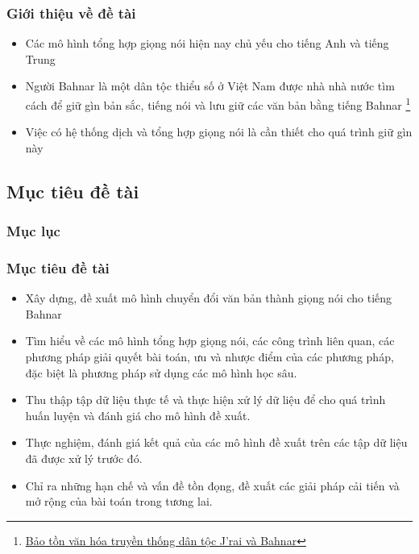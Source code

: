 \documentclass{beamer}
\numberwithin{figure}{section}
\numberwithin{table}{section}
\begin{document}
\begin{frame}
\frametitle{Giới thiệu về đề tài}
\begin{itemize}
    \item [--] Các mô hình tổng hợp giọng nói hiện nay chủ yếu cho tiếng Anh và tiếng Trung \cite{survey}
    \pause
    \item [--] Người Bahnar là một dân tộc thiểu số ở Việt Nam được nhà nhà nước tìm cách để giữ gìn bản sắc, tiếng nói và lưu giữ các văn bản bằng tiếng Bahnar \footnote{\href{https://dangcongsan.vn/tu-tuong-van-hoa/bao-ton-van-hoa-truyen-thong-dan-toc-jrai-va-bahnar-367994.html}{Bảo tồn văn hóa truyền thống dân tộc J’rai và Bahnar}}
    \pause
    \item[$\rightarrow$] Việc có hệ thống dịch và tổng hợp giọng nói là cần thiết cho quá trình giữ gìn này 
\end{itemize}


\end{frame}


 \subsection{Mục tiêu đề tài}
 {
    \begin{frame}
        \frametitle{Mục lục}
    \end{frame}
}
\begin{frame}
\frametitle{Mục tiêu đề tài}
\begin{itemize}
    \item[--] Xây dựng, đề xuất mô hình chuyển đổi văn bản thành giọng nói cho tiếng Bahnar 

    \item[--] Tìm hiểu về các mô hình tổng hợp giọng nói, các công trình liên quan, các phương pháp giải quyết bài toán, ưu và nhược điểm của các phương pháp, đặc biệt là phương pháp sử dụng các mô hình học sâu. 

    \item[--] Thu thập tập dữ liệu thực tế và thực hiện xử lý dữ liệu để cho quá trình huấn luyện và đánh giá cho mô hình đề xuất.

    \item[--] Thực nghiệm, đánh giá kết quả của các mô hình đề xuất trên các tập dữ liệu đã được xử lý trước đó.

    \item[--] Chỉ ra những hạn chế và vấn đề tồn đọng, đề xuất các giải pháp cải tiến và mở rộng của bài toán trong tương lai.
\end{itemize}

\end{frame}
\end{document}
